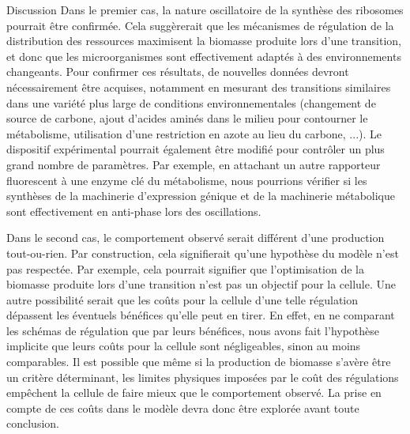 \begin{chapter_summary}{Discussion}
Dans le premier cas, la nature oscillatoire de la synthèse des ribosomes pourrait être confirmée.
Cela suggèrerait que les mécanismes de régulation de la distribution des ressources maximisent la biomasse produite lors d'une transition, et donc que les microorganismes sont effectivement adaptés à des environnements changeants.
Pour confirmer ces résultats, de nouvelles données devront nécessairement être acquises, notamment en mesurant des transitions similaires dans une variété plus large de conditions environnementales (changement de source de carbone, ajout d'acides aminés dans le milieu pour contourner le métabolisme, utilisation d'une restriction en azote au lieu du carbone, ...).
Le dispositif expérimental pourrait également être modifié pour contrôler un plus grand nombre de paramètres.
Par exemple, en attachant un autre rapporteur fluorescent à une enzyme clé du métabolisme, nous pourrions vérifier si les synthèses de la machinerie d'expression génique et de la machinerie métabolique sont effectivement en anti-phase lors des oscillations.

Dans le second cas, le comportement observé serait différent d'une production tout-ou-rien.
Par construction, cela signifierait qu'une hypothèse du modèle n'est pas respectée.
Par exemple, cela pourrait signifier que l'optimisation de la biomasse produite lors d'une transition n'est pas un objectif pour la cellule.
Une autre possibilité serait que les coûts pour la cellule d'une telle régulation dépassent les éventuels bénéfices qu'elle peut en tirer.
En effet, en ne comparant les schémas de régulation que par leurs bénéfices, nous avons fait l'hypothèse implicite que leurs coûts pour la cellule sont négligeables, sinon au moins comparables.
Il est possible que même si la production de biomasse s'avère être un critère déterminant, les limites physiques imposées par le coût des régulations empêchent la cellule de faire mieux que le comportement observé.
La prise en compte de ces coûts dans le modèle devra donc être explorée avant toute conclusion.


\end{chapter_summary}
